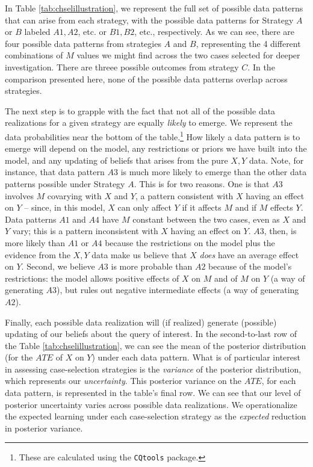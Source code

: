 \documentclass[
  12pt,
]{book}
\begin{document}
In Table \ref{tab:chselillustration}, we represent the full set of possible data patterns that can arise from each strategy, with the possible data patterns for Strategy \(A\) or \(B\) labeled \(A1, A2\), etc. or \(B1, B2\), etc., respectively. As we can see, there are four possible data patterns from strategies \(A\) and \(B\), representing the 4 different combinations of \(M\) values we might find across the two cases selected for deeper investigation. There are threee possible outcomes from strategy \(C\). In the comparison presented here, none of the possible data patterns overlap across strategies.

The next step is to grapple with the fact that not all of the possible data realizations for a given strategy are equally \emph{likely} to emerge. We represent the data probabilities near the bottom of the table.\footnote{These are calculated using the \texttt{CQtools} package.} How likely a data pattern is to emerge will depend on the model, any restrictions or priors we have built into the model, and any updating of beliefs that arises from the pure \(X,Y\) data. Note, for instance, that data pattern \(A3\) is much more likely to emerge than the other data patterns possible under Strategy \(A\). This is for two reasons. One is that \(A3\) involves \(M\) covarying with \(X\) and \(Y\), a pattern consistent with \(X\) having an effect on \(Y\) -- since, in this model, \(X\) can only affect \(Y\) if it affects \(M\) and if \(M\) effects \(Y\). Data patterns \(A1\) and \(A4\) have \(M\) constant between the two cases, even as \(X\) and \(Y\) vary; this is a pattern inconsistent with \(X\) having an effect on \(Y\). \(A3\), then, is more likely than \(A1\) or \(A4\) because the restrictions on the model plus the evidence from the \(X,Y\) data make us believe that \(X\) \emph{does} have an average effect on \(Y\). Second, we believe \(A3\) is more probable than \(A2\) because of the model's restrictions: the model allows positive effects of \(X\) on \(M\) and of \(M\) on \(Y\) (a way of generating \(A3\)), but rules out negative intermediate effects (a way of generating \(A2\)).

Finally, each possible data realization will (if realized) generate (possible) updating of our beliefs about the query of interest. In the second-to-last row of the Table \ref{tab:chselillustration}, we can see the mean of the posterior distribution (for the \(ATE\) of \(X\) on \(Y\)) under each data pattern. What is of particular interest in assessing case-selection strategies is the \emph{variance} of the posterior distribution, which represents our \emph{uncertainty}. This posterior variance on the \(ATE\), for each data pattern, is represented in the table's final row. We can see that our level of posterior uncertainty varies across possible data realizations. We operationalize the expected learning under each case-selection strategy as the \emph{expected} reduction in posterior variance.
\end{document}
